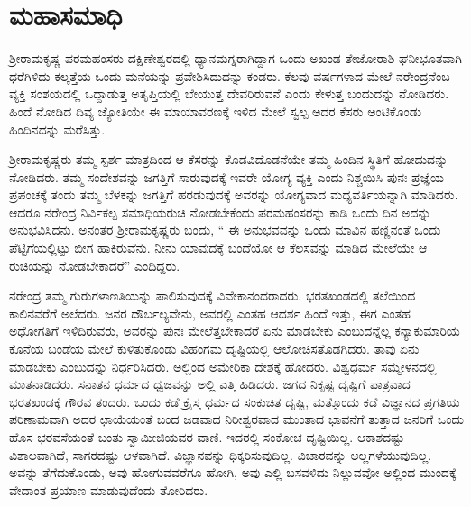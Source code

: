 
\chapter{ಮಹಾಸಮಾಧಿ }

 ಶ‍್ರೀರಾಮಕೃಷ್ಣ ಪರಮಹಂಸರು ದಕ್ಷಿಣೇಶ್ವರದಲ್ಲಿ ಧ್ಯಾನಮಗ್ನರಾಗಿದ್ದಾಗ ಒಂದು ಅಖಂಡ-ತೇಜೋರಾಶಿ ಘನೀಭೂತವಾಗಿ ಧರೆಗಿಳಿದು ಕಲ್ಕತ್ತೆಯ ಒಂದು ಮನೆಯನ್ನು ಪ್ರವೇಶಿಸಿದುದನ್ನು ಕಂಡರು. ಕೆಲವು ವರ್ಷಗಳಾದ ಮೇಲೆ ನರೇಂದ್ರನೆಂಬ ವ್ಯಕ್ತಿ ಸಂಶಯದಲ್ಲಿ ಒದ್ದಾಡುತ್ತ ಅತೃಪ್ತಿಯಲ್ಲಿ ಬೇಯುತ್ತ ದೇವರಿರುವನೆ ಎಂದು ಕೇಳುತ್ತ ಬಂದುದನ್ನು ನೋಡಿದರು. ಹಿಂದೆ ನೋಡಿದ ದಿವ್ಯ ಜ್ಯೋತಿಯೇ ಈ ಮಾಯಾವರಣಕ್ಕೆ ಇಳಿದ ಮೇಲೆ ಸ್ವಲ್ಪ ಅದರ ಕೆಸರು ಅಂಟಿಕೊಂಡು ಹಿಂದಿನದನ್ನು ಮರೆಸಿತ್ತು. 

 ಶ‍್ರೀರಾಮಕೃಷ್ಣರು ತಮ್ಮ ಸ್ಪರ್ಶ ಮಾತ್ರದಿಂದ ಆ ಕೆಸರನ್ನು ಕೊಡವಿದೊಡನೆಯೇ ತಮ್ಮ ಹಿಂದಿನ ಸ್ಥಿತಿಗೆ ಹೋದುದನ್ನು ನೋಡಿದರು. ತಮ್ಮ ಸಂದೇಶವನ್ನು ಜಗತ್ತಿಗೆ ಸಾರುವುದಕ್ಕೆ ಇವರೇ ಯೋಗ್ಯ ವ್ಯಕ್ತಿ ಎಂದು ನಿಶ್ಚಯಿಸಿ ಪುನಃ ಪ್ರಜ್ಞೆಯ ಪ್ರಪಂಚಕ್ಕೆ ತಂದು ತಮ್ಮ ಬೆಳಕನ್ನು ಜಗತ್ತಿಗೆ ಹರಡುವುದಕ್ಕೆ ಅವರನ್ನು ಯೋಗ್ಯವಾದ ಮಧ್ಯವರ್ತಿಯನ್ನಾಗಿ ಮಾಡಿದರು. ಆದರೂ ನರೇಂದ್ರ ನಿರ್ವಿಕಲ್ಪ ಸಮಾಧಿಯರುಚಿ ನೋಡಬೇಕೆಂದು ಪರಮಹಂಸರನ್ನು ಕಾಡಿ ಒಂದು ದಿನ ಅದನ್ನು ಅನುಭವಿಸಿದನು. ಅನಂತರ ಶ‍್ರೀರಾಮಕೃಷ್ಣರು ಬಂದು, “ ಈ ಅನುಭವವನ್ನು ಒಂದು ಮಾವಿನ ಹಣ್ಣಿನಂತೆ ಒಂದು ಪೆಟ್ಟಿಗೆಯಲ್ಲಿಟ್ಟು ಬೀಗ ಹಾಕಿರುವೆನು. ನೀನು ಯಾವುದಕ್ಕೆ ಬಂದೆಯೋ ಆ ಕೆಲಸವನ್ನು ಮಾಡಿದ ಮೇಲೆಯೇ ಆ ರುಚಿಯನ್ನು ನೋಡಬೇಕಾದರೆ” ಎಂದಿದ್ದರು. 

 ನರೇಂದ್ರ ತಮ್ಮ ಗುರುಗಳಾಣತಿಯನ್ನು ಪಾಲಿಸುವುದಕ್ಕೆ ವಿವೇಕಾನಂದರಾದರು. ಭರತಖಂಡದಲ್ಲಿ ತಲೆಯಿಂದ ಕಾಲಿನವರೆಗೆ ಅಲೆದರು. ಜನರ ದೌರ್ಬಲ್ಯವೇನು, ಅವರಲ್ಲಿ ಎಂತಹ ಆದರ್ಶ ಹಿಂದೆ ಇತ್ತು, ಈಗ ಎಂತಹ ಅಧೋಗತಿಗೆ ಇಳಿದಿರುವರು, ಅವರನ್ನು ಪುನಃ ಮೇಲೆತ್ತಬೇಕಾದರೆ ಏನು ಮಾಡಬೇಕು ಎಂಬುದನ್ನೆಲ್ಲ ಕನ್ಯಾಕುಮಾರಿಯ ಕೊನೆಯ ಬಂಡೆಯ ಮೇಲೆ ಕುಳಿತುಕೊಂಡು ವಿಹಂಗಮ ದೃಷ್ಟಿಯಲ್ಲಿ ಆಲೋಚಿಸತೊಡಗಿದರು. ತಾವು ಏನು ಮಾಡಬೇಕು ಎಂಬುದನ್ನು ನಿರ್ಧರಿಸಿದರು. ಅಲ್ಲಿಂದ ಅಮೇರಿಕಾ ದೇಶಕ್ಕೆ ಹೋದರು. ವಿಶ್ವಧರ್ಮ ಸಮ್ಮೇಳನದಲ್ಲಿ ಮಾತನಾಡಿದರು. ಸನಾತನ ಧರ್ಮದ ಧ್ವಜವನ್ನು ಅಲ್ಲಿ ಎತ್ತಿ ಹಿಡಿದರು. ಜಗದ ನಿಕೃಷ್ಟ ದೃಷ್ಟಿಗೆ ಪಾತ್ರವಾದ ಭರತಖಂಡಕ್ಕೆ ಗೌರವ ತಂದರು. ಒಂದು ಕಡೆ ಕ್ರೈಸ್ತ ಧರ್ಮದ ಸಂಕುಚಿತ ದೃಷ್ಟಿ, ಮತ್ತೊಂದು ಕಡೆ ವಿಜ್ಞಾನದ ಪ್ರಗತಿಯ ಪರಿಣಾಮವಾಗಿ ಅದರ ಛಾಯೆಯಂತೆ ಬಂದ ಜಡವಾದ ನಿರೀಶ್ವರವಾದ ಮುಂತಾದ ಭಾವನೆಗೆ ತುತ್ತಾದ ಜನರಿಗೆ ಒಂದು ಹೊಸ ಭರವಸೆಯಂತೆ ಬಂತು ಸ್ವಾಮೀಜಿಯವರ ವಾಣಿ. ಇದರಲ್ಲಿ ಸಂಕೋಚ ದೃಷ್ಟಿಯಿಲ್ಲ. ಆಕಾಶದಷ್ಟು ವಿಶಾಲವಾಗಿದೆ, ಸಾಗರದಷ್ಟು ಆಳವಾಗಿದೆ. ವಿಜ್ಞಾನವನ್ನು ಧಿಕ್ಕರಿಸುವುದಿಲ್ಲ. ವಿಚಾರವನ್ನು ಅಲ್ಲಗಳೆಯುವುದಿಲ್ಲ. ಅವನ್ನು ತೆಗೆದುಕೊಂಡು, ಅವು ಹೋಗುವವರೆಗೂ ಹೋಗಿ, ಅವು ಎಲ್ಲಿ ಬಸವಳಿದು ನಿಲ್ಲುವವೋ ಅಲ್ಲಿಂದ ಮುಂದಕ್ಕೆ ವೇದಾಂತ ಪ್ರಯಾಣ ಮಾಡುವುದೆಂದು ತೋರಿದರು. 

